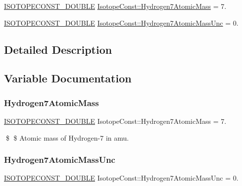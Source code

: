 \begin{DoxyCompactItemize}
\item 
\mbox{\hyperlink{group___isotope_const-_macros_ga8f45a7272ce02c0b4c65c44636ed719a}{I\+S\+O\+T\+O\+P\+E\+C\+O\+N\+S\+T\+\_\+\+D\+O\+U\+B\+LE}} \mbox{\hyperlink{group___isotope_const-_hydrogen-_h7_ga601419e653db07a0137806ec16d52c0f}{Isotope\+Const\+::\+Hydrogen7\+Atomic\+Mass}} = 7.
\item 
\mbox{\hyperlink{group___isotope_const-_macros_ga8f45a7272ce02c0b4c65c44636ed719a}{I\+S\+O\+T\+O\+P\+E\+C\+O\+N\+S\+T\+\_\+\+D\+O\+U\+B\+LE}} \mbox{\hyperlink{group___isotope_const-_hydrogen-_h7_ga1db2d6dfd20b0eb1498f1256a36566f3}{Isotope\+Const\+::\+Hydrogen7\+Atomic\+Mass\+Unc}} = 0.
\end{DoxyCompactItemize}


\subsection{Detailed Description}


\subsection{Variable Documentation}
\mbox{\label{group___isotope_const-_hydrogen-_h7_ga601419e653db07a0137806ec16d52c0f}} 
\subsubsection{\texorpdfstring{Hydrogen7\+Atomic\+Mass}{Hydrogen7AtomicMass}}
{\footnotesize\ttfamily \mbox{\hyperlink{group___isotope_const-_macros_ga8f45a7272ce02c0b4c65c44636ed719a}{I\+S\+O\+T\+O\+P\+E\+C\+O\+N\+S\+T\+\_\+\+D\+O\+U\+B\+LE}} Isotope\+Const\+::\+Hydrogen7\+Atomic\+Mass = 7.}

\$ \$ Atomic mass of Hydrogen-\/7 in amu. \mbox{\label{group___isotope_const-_hydrogen-_h7_ga1db2d6dfd20b0eb1498f1256a36566f3}} 
\subsubsection{\texorpdfstring{Hydrogen7\+Atomic\+Mass\+Unc}{Hydrogen7AtomicMassUnc}}
{\footnotesize\ttfamily \mbox{\hyperlink{group___isotope_const-_macros_ga8f45a7272ce02c0b4c65c44636ed719a}{I\+S\+O\+T\+O\+P\+E\+C\+O\+N\+S\+T\+\_\+\+D\+O\+U\+B\+LE}} Isotope\+Const\+::\+Hydrogen7\+Atomic\+Mass\+Unc = 0.}

